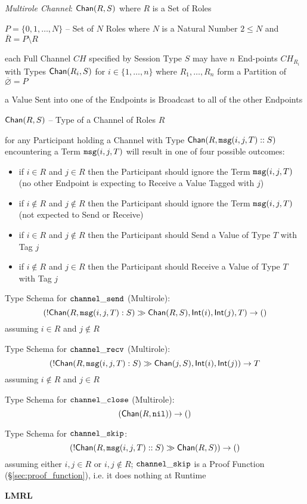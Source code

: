 \emph{Multirole Channel}: $\mathsf{Chan}(R,S)$ where $R$ is a Set of Roles

$P = \{0, 1, \ldots, N\}$ -- Set of $N$ Roles where $N$ is a Natural
Number $2 \leq N$ and $\overline{R} = P \setminus R$

each Full Channel $CH$ specified by Session Type $S$ may have $n$
End-points $CH_{R_i}$ with Types $\mathsf{Chan}(R_i,S)$ for $i \in
\{1,\ldots,n\}$ where $R_1, \ldots, R_n$ form a Partition of
$\overline{\varnothing} = P$

a Value Sent into one of the Endpoints is Broadcast to all of the
other Endpoints

$\mathsf{Chan}(R,S)$ -- Type of a Channel of Roles $R$

for any Participant holding a Channel with Type $\mathsf{Chan}(R,
\mathtt{msg}(i,j,T)::S)$ encountering a Term $\mathtt{msg}(i,j,T)$ will result in one
of four possible outcomes:
\begin{itemize}
  \item if $i \in R$ and $j \in R$ then the Participant should ignore
    the Term $\mathtt{msg}(i,j,T)$ (no other Endpoint is expecting to Receive
    a Value Tagged with $j$)
  \item if $i \notin R$ and $j \notin R$ then the Participant should
    ignore the Term $\mathtt{msg}(i,j,T)$ (not expected to Send or Receive)
  \item if $i \in R$ and $j \notin R$ then the Participant should Send
    a Value of Type $T$ with Tag $j$
  \item if $i \notin R$ and $j \in R$ then the Participant should
    Receive a Value of Type $T$ with Tag $j$
\end{itemize}

Type Schema for $\mathtt{channel\_send}$ (Multirole):
\[
  (!\mathsf{Chan} (R, \mathtt{msg}(i,j,T):S) \gg \mathsf{Chan}(R,S), \mathsf{Int}(i), \mathsf{Int}(j), T)
    \rightarrow \mathsf{()}
\]
assuming $i \in R$ and $j \notin R$

Type Schema for $\mathtt{channel\_recv}$ (Multirole):
\[
  (!\mathsf{Chan} (R, \mathtt{msg}(i,j,T):S) \gg \mathsf{Chan}(j,S), \mathsf{Int}(i), \mathsf{Int}(j))
    \rightarrow T
\]
assuming $i \notin R$ and $j \in R$

Type Schema for $\mathtt{channel\_close}$ (Multirole):
\[
  (\mathsf{Chan}(R, \mathtt{nil})) \rightarrow \mathsf{()}
\]

Type Schema for $\mathtt{channel\_skip}$:
\[
  (!\mathsf{Chan}(R,\mathtt{msg}(i,j,T)::S) \gg \mathsf{Chan}(R,S)) \rightarrow \mathsf{()}
\]
assuming either $i,j \in R$ or $i,j \notin R$; $\mathtt{channel\_skip}$ is a
Proof Function (\S\ref{sec:proof_function}), i.e. it does nothing at
Runtime


\textbf{LMRL}

